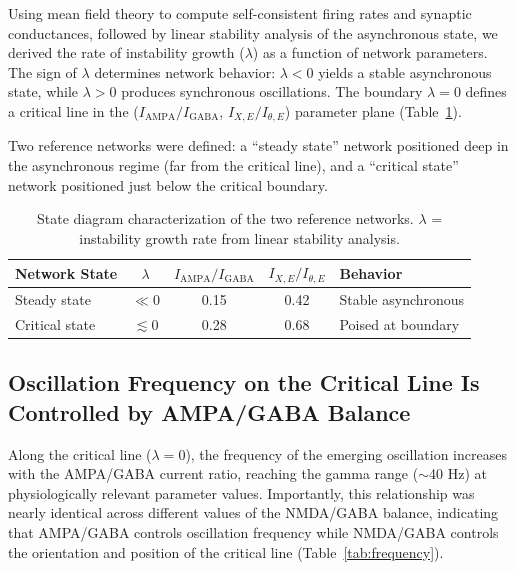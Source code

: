 \documentclass[11pt]{article}
\begin{document}
Using mean field theory to compute self-consistent firing rates and synaptic conductances, followed by linear stability analysis of the asynchronous state, we derived the rate of instability growth ($\lambda$) as a function of network parameters. The sign of $\lambda$ determines network behavior: $\lambda < 0$ yields a stable asynchronous state, while $\lambda > 0$ produces synchronous oscillations. The boundary $\lambda = 0$ defines a critical line in the ($I_{\mathrm{AMPA}}/I_{\mathrm{GABA}}$, $I_{X,E}/I_{\theta,E}$) parameter plane (Table~\ref{tab:state_diagram}).

Two reference networks were defined: a ``steady state'' network positioned deep in the asynchronous regime (far from the critical line), and a ``critical state'' network positioned just below the critical boundary.

\begin{table}[H]
\centering
\caption{State diagram characterization of the two reference networks. $\lambda$ = instability growth rate from linear stability analysis.}
\label{tab:state_diagram}
\begin{tabular}{lcccl}
\toprule
\textbf{Network State} & \textbf{$\lambda$} & \textbf{$I_{\mathrm{AMPA}}/I_{\mathrm{GABA}}$} & \textbf{$I_{X,E}/I_{\theta,E}$} & \textbf{Behavior} \\
\midrule
Steady state & $\ll 0$ & 0.15 & 0.42 & Stable asynchronous \\
Critical state & $\lesssim 0$ & 0.28 & 0.68 & Poised at boundary \\
\bottomrule
\end{tabular}
\end{table}

\subsection{Oscillation Frequency on the Critical Line Is Controlled by AMPA/GABA Balance}

Along the critical line ($\lambda = 0$), the frequency of the emerging oscillation increases with the AMPA/GABA current ratio, reaching the gamma range ($\sim$40 Hz) at physiologically relevant parameter values. Importantly, this relationship was nearly identical across different values of the NMDA/GABA balance, indicating that AMPA/GABA controls oscillation frequency while NMDA/GABA controls the orientation and position of the critical line (Table~\ref{tab:frequency}).
\end{document}
